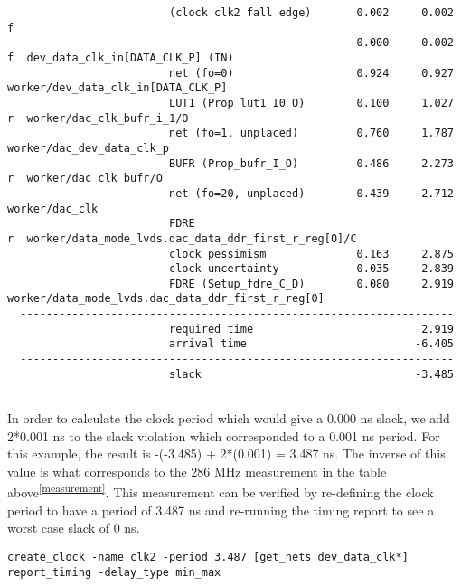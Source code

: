 \documentclass{article}
\begin{document}
\begin{lstlisting}
                         (clock clk2 fall edge)       0.002     0.002 f  
                                                      0.000     0.002 f  dev_data_clk_in[DATA_CLK_P] (IN)
                         net (fo=0)                   0.924     0.927    worker/dev_data_clk_in[DATA_CLK_P]
                         LUT1 (Prop_lut1_I0_O)        0.100     1.027 r  worker/dac_clk_bufr_i_1/O
                         net (fo=1, unplaced)         0.760     1.787    worker/dac_dev_data_clk_p
                         BUFR (Prop_bufr_I_O)         0.486     2.273 r  worker/dac_clk_bufr/O
                         net (fo=20, unplaced)        0.439     2.712    worker/dac_clk
                         FDRE                                         r  worker/data_mode_lvds.dac_data_ddr_first_r_reg[0]/C
                         clock pessimism              0.163     2.875    
                         clock uncertainty           -0.035     2.839    
                         FDRE (Setup_fdre_C_D)        0.080     2.919    worker/data_mode_lvds.dac_data_ddr_first_r_reg[0]
  -------------------------------------------------------------------
                         required time                          2.919    
                         arrival time                          -6.405    
  -------------------------------------------------------------------
                         slack                                 -3.485    


\end{lstlisting}
\fontsize{10}{12}\selectfont
In order to calculate the clock period which would give a 0.000 ns slack, we add 2*0.001 ns to the slack violation which corresponded to a 0.001 ns period. For this example, the result is -(-3.485) + 2*(0.001) = 3.487 ns. The inverse of this value is what corresponds to the 286 MHz measurement in the table above\textsuperscript{\ref{measurement}}. This measurement can be verified by re-defining the clock period to have a period of 3.487 ns and re-running the timing report to see a worst case slack of 0 ns.
\begin{lstlisting}
create_clock -name clk2 -period 3.487 [get_nets dev_data_clk*]
report_timing -delay_type min_max
\end{lstlisting}
\fontsize{6}{12}\selectfont
\end{document}
